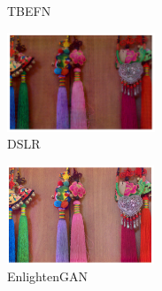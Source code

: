 \documentclass[letterpaper,12pt]{article}
\begin{document}
\begin{figure}[htbp]
\begin{subfigure}{0.18\textwidth}
			\captionsetup{font=scriptsize}
			\caption{TBEFN}
			\label{fig: LOL-test_h}  
		\end{subfigure}
		\begin{subfigure}{0.18\textwidth}
			\includegraphics[width=\linewidth]{LOL-test_dataset/DSLR}
			\captionsetup{font=scriptsize}
			\caption{DSLR}
			\label{fig: LOL-test_i}  
		\end{subfigure}
		\begin{subfigure}{0.18\textwidth}
			\includegraphics[width=\linewidth]{LOL-test_dataset/EnlightenGAN}
			\captionsetup{font=scriptsize}
			\caption{EnlightenGAN}
			\label{fig: LOL-test_j}  
		\end{subfigure}\\
		\begin{subfigure}{0.18\textwidth}

\end{subfigure}
\end{figure}
\end{document}
